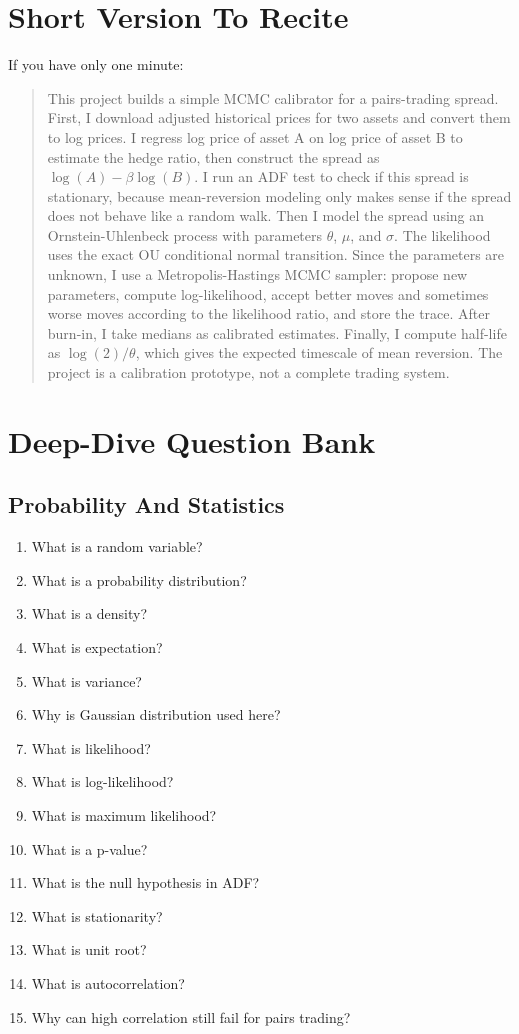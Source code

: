 \documentclass[11pt]{article}
\begin{document}
\section{Short Version To Recite}

If you have only one minute:

\begin{quote}
This project builds a simple MCMC calibrator for a pairs-trading spread. First,
I download adjusted historical prices for two assets and convert them to log
prices. I regress log price of asset A on log price of asset B to estimate the
hedge ratio, then construct the spread as $\log(A)-\beta\log(B)$. I run an ADF
test to check if this spread is stationary, because mean-reversion modeling only
makes sense if the spread does not behave like a random walk. Then I model the
spread using an Ornstein-Uhlenbeck process with parameters $\theta$, $\mu$, and
$\sigma$. The likelihood uses the exact OU conditional normal transition. Since
the parameters are unknown, I use a Metropolis-Hastings MCMC sampler: propose
new parameters, compute log-likelihood, accept better moves and sometimes worse
moves according to the likelihood ratio, and store the trace. After burn-in, I
take medians as calibrated estimates. Finally, I compute half-life as
$\log(2)/\theta$, which gives the expected timescale of mean reversion. The
project is a calibration prototype, not a complete trading system.
\end{quote}

\section{Deep-Dive Question Bank}

\subsection{Probability And Statistics}

\begin{enumerate}
  \item What is a random variable?
  \item What is a probability distribution?
  \item What is a density?
  \item What is expectation?
  \item What is variance?
  \item Why is Gaussian distribution used here?
  \item What is likelihood?
  \item What is log-likelihood?
  \item What is maximum likelihood?
  \item What is a p-value?
  \item What is the null hypothesis in ADF?
  \item What is stationarity?
  \item What is unit root?
  \item What is autocorrelation?
  \item Why can high correlation still fail for pairs trading?
\end{enumerate}
\end{document}
